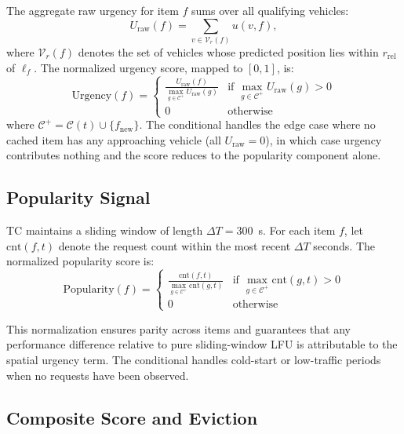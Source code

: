 \documentclass[preprint,12pt]{elsarticle}
\begin{document}
	The aggregate raw urgency for item $f$ sums over all qualifying vehicles:
	\begin{equation}
		U_\text{raw}(f) = \sum_{v \in \mathcal{V}_r(f)} u(v, f),
		\label{eq:urgency_raw_method}
	\end{equation}
	where $\mathcal{V}_r(f)$ denotes the set of vehicles whose predicted position lies within $r_\text{rel}$ of $\ell_f$. The normalized urgency score, mapped to $[0, 1]$, is:
	\begin{equation}
		\text{Urgency}(f) = \begin{cases} \frac{U_\text{raw}(f)}{\max_{g \in \mathcal{C}^+} U_\text{raw}(g)} & \text{if } \max_{g \in \mathcal{C}^+} U_\text{raw}(g) > 0 \\ 0 & \text{otherwise} \end{cases}
		\label{eq:urgency_norm_method}
	\end{equation}
	where $\mathcal{C}^+ = \mathcal{C}(t) \cup \{f_\text{new}\}$. The conditional handles the edge case where no cached item has any approaching vehicle (all $U_\text{raw} = 0$), in which case urgency contributes nothing and the score reduces to the popularity component alone.
	
	\subsection{Popularity Signal}
	
	TC maintains a sliding window of length $\Delta T = 300$~s. For each item $f$, let $\text{cnt}(f, t)$ denote the request count within the most recent $\Delta T$ seconds. The normalized popularity score is:
	\begin{equation}
		\text{Popularity}(f) = \begin{cases} \frac{\text{cnt}(f, t)}{\max_{g \in \mathcal{C}^+} \text{cnt}(g, t)} & \text{if } \max_{g \in \mathcal{C}^+} \text{cnt}(g, t) > 0 \\ 0 & \text{otherwise} \end{cases}
		\label{eq:popularity_method}
	\end{equation}
	
	This normalization ensures parity across items and guarantees that any performance difference relative to pure sliding-window LFU is attributable to the spatial urgency term. The conditional handles cold-start or low-traffic periods when no requests have been observed.
	
	\subsection{Composite Score and Eviction}
	
\end{document}
